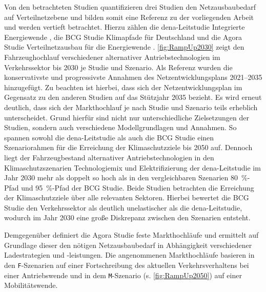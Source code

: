 

Von den betrachteten Studien quantifizieren drei Studien den Netzausbaubedarf auf Verteilnetzebene und bilden somit eine Referenz zu der vorliegenden Arbeit und werden vertieft betrachtet.
Hierzu zählen die dena-Leitstudie \glqq Integrierte Energiewende\grqq{} \cite{DEAGH2018}, die BCG Studie \glqq Klimapfade für Deutschland\grqq{} \cite{BCG2018} und die Agora Studie \glqq Verteilnetzausbau für die Energiewende\grqq{} \cite{Agora2019}.
\autoref{fig:RampUp2030} zeigt den Fahrzeughochlauf verschiedener alternativer Antriebstechnologien im Verkehrssektor bis \num{2030} je Studie und Szenario.
Als Referenz wurden die konservativste und progressivste Annahmen des Netzentwicklungsplans \numrange[range-phrase=~{--}~]{2021}{2035} \cite{BNetzA2020} hinzugefügt.
Zu beachten ist hierbei, dass sich der Netzentwicklungsplan im Gegensatz zu den anderen Studien auf das Stützjahr \num{2035} bezieht.
Es wird erneut deutlich, dass sich der Markthochlauf je nach Studie und Szenario teils erheblich unterscheidet.
Grund hierfür sind nicht nur unterschiedliche Zielsetzungen der Studien, sondern auch verschiedene Modellgrundlagen und Annahmen.
So spannen sowohl die dena-Leitstudie als auch die BCG Studie einen Szenariorahmen für die Erreichung der Klimaschutzziele bis \num{2050} auf.
Dennoch liegt der Fahrzeugbestand alternativer Antriebstechnologien in den Klimaschutzszenarien \glqq Technologiemix\grqq{} und \glqq Elektrifizierung\grqq{} der dena-Leitstudie im Jahr 2030 mehr als doppelt so hoch als in den vergleichbaren Szenarien \glqq \SI{80}{\percent}-Pfad\grqq{} und \glqq \SI{95}{\percent}-Pfad\grqq{} der BCG Studie.
Beide Studien betrachten die Erreichung der Klimaschutzziele über alle relevanten Sektoren.
Hierbei bewertet die BCG Studie den Verkehrssektor als deutlich unelastischer als die dena-Leitstudie, wodurch im Jahr \num{2030} eine große Diskrepanz zwischen den Szenarien entsteht.\medskip

Demgegenüber definiert die Agora Studie feste Markthochläufe und ermittelt auf Grundlage dieser den nötigen Netzausbaubedarf in Abhängigkeit verschiedener Ladestrategien und -leistungen.
Die angenommenen Markthochläufe basieren in den \texttt{F}-Szenarien auf einer Fortschreibung des aktuellen Verkehrsverhaltens bei einer Antriebswende und in dem \texttt{M}-Szenario (s. \autoref{fig:RampUp2050}) auf einer Mobilitätswende.



